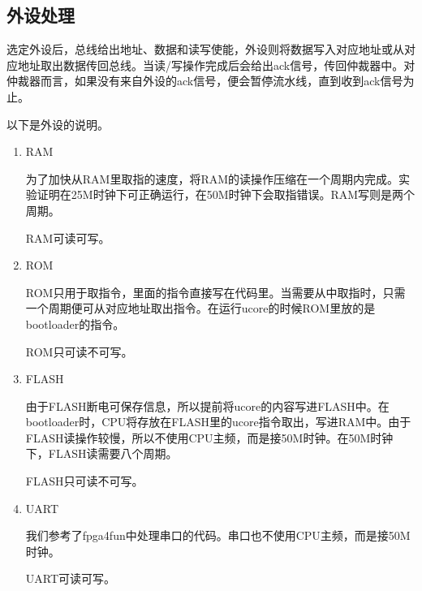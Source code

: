 \subsection{外设处理}

选定外设后，总线给出地址、数据和读写使能，外设则将数据写入对应地址或从对应地址取出数据传回总线。当读/写操作完成后会给出ack信号，传回仲裁器中。对仲裁器而言，如果没有来自外设的ack信号，便会暂停流水线，直到收到ack信号为止。

以下是外设的说明。

\begin{enumerate}
	\item RAM
	
	为了加快从RAM里取指的速度，将RAM的读操作压缩在一个周期内完成。实验证明在25M时钟下可正确运行，在50M时钟下会取指错误。RAM写则是两个周期。
	
	RAM可读可写。
	
	\item ROM
	
	ROM只用于取指令，里面的指令直接写在代码里。当需要从中取指时，只需一个周期便可从对应地址取出指令。在运行ucore的时候ROM里放的是bootloader的指令。
	
	ROM只可读不可写。
	
	\item FLASH
	
	由于FLASH断电可保存信息，所以提前将ucore的内容写进FLASH中。在bootloader时，CPU将存放在FLASH里的ucore指令取出，写进RAM中。由于FLASH读操作较慢，所以不使用CPU主频，而是接50M时钟。在50M时钟下，FLASH读需要八个周期。
	
	FLASH只可读不可写。
	
	\item UART
	
	我们参考了fpga4fun中处理串口的代码。串口也不使用CPU主频，而是接50M时钟。
	
	UART可读可写。
	
\end{enumerate}
